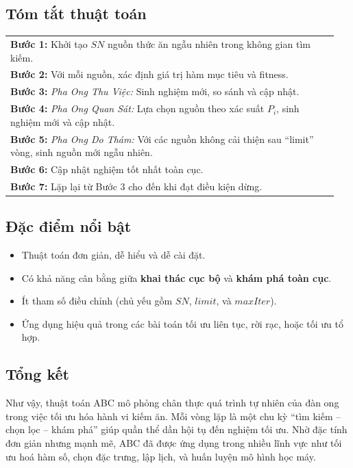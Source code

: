 \documentclass[a4paper]{report}
\begin{document}
\subsection{Tóm tắt thuật toán}
\begin{center}
\begin{tabular}{p{0.95\linewidth}}
\textbf{Bước 1:} Khởi tạo $SN$ nguồn thức ăn ngẫu nhiên trong không gian tìm kiếm. \\[0.4em]
\textbf{Bước 2:} Với mỗi nguồn, xác định giá trị hàm mục tiêu và fitness. \\[0.4em]
\textbf{Bước 3:} \textit{Pha Ong Thu Việc:} Sinh nghiệm mới, so sánh và cập nhật. \\[0.4em]
\textbf{Bước 4:} \textit{Pha Ong Quan Sát:} Lựa chọn nguồn theo xác suất $P_i$, sinh nghiệm mới và cập nhật. \\[0.4em]
\textbf{Bước 5:} \textit{Pha Ong Do Thám:} Với các nguồn không cải thiện sau “limit” vòng, sinh nguồn mới ngẫu nhiên. \\[0.4em]
\textbf{Bước 6:} Cập nhật nghiệm tốt nhất toàn cục. \\[0.4em]
\textbf{Bước 7:} Lặp lại từ Bước 3 cho đến khi đạt điều kiện dừng. \\
\end{tabular}
\end{center}

\subsection{Đặc điểm nổi bật}
\begin{itemize}
    \item Thuật toán đơn giản, dễ hiểu và dễ cài đặt.
    \item Có khả năng cân bằng giữa \textbf{khai thác cục bộ} và \textbf{khám phá toàn cục}.
    \item Ít tham số điều chỉnh (chủ yếu gồm $SN$, $limit$, và $maxIter$).
    \item Ứng dụng hiệu quả trong các bài toán tối ưu liên tục, rời rạc, hoặc tối ưu tổ hợp.
\end{itemize}

\subsection{Tổng kết}
Như vậy, thuật toán ABC mô phỏng chân thực quá trình tự nhiên của đàn ong trong việc tối ưu hóa hành vi kiếm ăn. Mỗi vòng lặp là một chu kỳ “tìm kiếm – chọn lọc – khám phá” giúp quần thể dần hội tụ đến nghiệm tối ưu. Nhờ đặc tính đơn giản nhưng mạnh mẽ, ABC đã được ứng dụng trong nhiều lĩnh vực như tối ưu hoá hàm số, chọn đặc trưng, lập lịch, và huấn luyện mô hình học máy.
\end{document}
